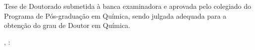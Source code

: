 %
% 
%
\begin{folhadeaprovacao}

	\begin{center}
		{\ABNTEXchapterfont\large\imprimirautor}

		\vspace*{\fill}\vspace*{\fill}
		\begin{center}
			\ABNTEXchapterfont\bfseries\Large\imprimirtitulo{}
		\end{center}
		\vspace*{\fill}

		\hspace{.45\textwidth}
		\begin{minipage}{.5\textwidth}
			\imprimirpreambulo{}
		\end{minipage}%
		\vspace*{\fill}
	\end{center}

	Tese de Doutorado submetida
	à banca examinadora
	e aprovada pelo colegiado do Programa de Pós-graduação em Química,
	sendo julgada adequada para a obtenção do grau de Doutor em Química.

	\imprimirlocal, \imprimirdata:



\end{folhadeaprovacao}
